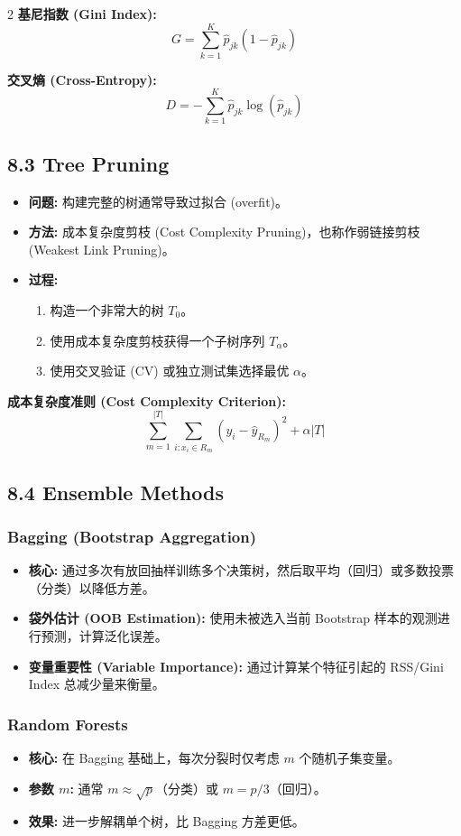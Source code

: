 \documentclass[6pt,a4paper]{ctexart}
\begin{document}
\begin{multicols}{2}
\textbf{基尼指数 (Gini Index):}
$$ G = \sum_{k=1}^{K} \hat{p}_{jk} (1 - \hat{p}_{jk}) $$

\textbf{交叉熵 (Cross-Entropy):}
$$ D = - \sum_{k=1}^{K} \hat{p}_{jk} \log (\hat{p}_{jk}) $$

\subsection*{8.3 Tree Pruning}
\begin{itemize}
    \item \textbf{问题:} 构建完整的树通常导致过拟合 (overfit)。
    \item \textbf{方法:} 成本复杂度剪枝 (Cost Complexity Pruning)，也称作弱链接剪枝 (Weakest Link Pruning)。
    \item \textbf{过程:}
    \begin{enumerate}
        \item 构造一个非常大的树 $T_0$。
        \item 使用成本复杂度剪枝获得一个子树序列 $T_{\alpha}$。
        \item 使用交叉验证 (CV) 或独立测试集选择最优 $\alpha$。
    \end{enumerate}
\end{itemize}

\textbf{成本复杂度准则 (Cost Complexity Criterion):}
$$ \sum_{m=1}^{|T|} \sum_{i: x_{i} \in R_{m}} (y_{i} - \hat{y}_{R_{m}})^{2} + \alpha |T| $$

\subsection*{8.4 Ensemble Methods}

\subsubsection*{Bagging (Bootstrap Aggregation)}
\begin{itemize}
    \item \textbf{核心:} 通过多次有放回抽样训练多个决策树，然后取平均（回归）或多数投票（分类）以降低方差。
    \item \textbf{袋外估计 (OOB Estimation):} 使用未被选入当前 Bootstrap 样本的观测进行预测，计算泛化误差。
    \item \textbf{变量重要性 (Variable Importance):} 通过计算某个特征引起的 RSS/Gini Index 总减少量来衡量。
\end{itemize}

\subsubsection*{Random Forests}
\begin{itemize}
    \item \textbf{核心:} 在 Bagging 基础上，每次分裂时仅考虑 $m$ 个随机子集变量。
    \item \textbf{参数 $m$:} 通常 $m \approx \sqrt{p}$（分类）或 $m = p/3$（回归）。
    \item \textbf{效果:} 进一步解耦单个树，比 Bagging 方差更低。
\end{itemize}


\end{multicols}
\end{document}
